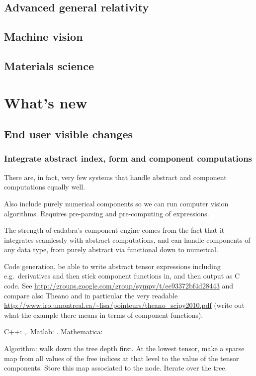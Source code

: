 \documentclass[11pt]{article}
\begin{document}
\subsection{Advanced general relativity}
\subsection{Machine vision}
\subsection{Materials science}

\section{What's new}
\subsection{End user visible changes}
\subsubsection{Integrate abstract index, form and component computations}

There are, in fact, very few systems that handle abstract and
component computations equally well.

Also include purely numerical components so we can run computer vision
algorithms. Requires pre-parsing and pre-computing of expressions.

The strength of cadabra's component engine comes from the fact that it
integrates seamlessly with abstract computations, and can handle
components of any data type, from purely abstract via functional down
to numerical.

Code generation, be able to write abstract tensor expressions
including e.g.~derivatives and then stick component functions in, and
then output as C code. See
\url{http://groups.google.com/group/sympy/t/ee93372bf4d28443}
and compare also Theano and in particular the
very readable \url{http://www.iro.umontreal.ca/~lisa/pointeurs/theano_scipy2010.pdf}
(write out what the example there means in terms of component functions).

C++: \cite{ltensor},\cite{ftensor}.
Matlab: \cite{TTB_Software}.
Mathematica: \cite{kranc}

Algorithm: walk down the tree depth first. At the lowest tensor, make
a sparse map from all values of the free indices at that level to the
value of the tensor components. Store this map associated to the
node. Iterate over the tree.
\end{document}
